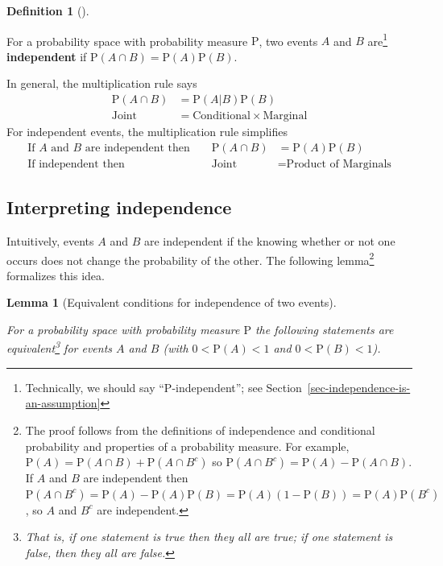 \documentclass[
  letterpaper,
  DIV=11,
  numbers=noendperiod]{scrreprt}
\theoremstyle{plain}
\newtheorem{lemma}{Lemma}[chapter]
\theoremstyle{definition}
\theoremstyle{definition}
\theoremstyle{definition}
\newtheorem{definition}{Definition}[chapter]
\theoremstyle{remark}
\begin{document}
\begin{definition}[]\protect\hypertarget{def-independent-events}{}\label{def-independent-events}

For a probability space with probability measure \(\textrm{P}\), two
events \(A\) and \(B\) are\footnote{Technically, we should say
  ``\(\textrm{P}\)-independent''; see
  Section~\ref{sec-independence-is-an-assumption}}
\textbf{independent} if
\(\textrm{P}(A \cap B) = \textrm{P}(A)\textrm{P}(B)\).

\end{definition}

In general, the multiplication rule says \begin{align*}
\textrm{P}(A \cap B) & = \textrm{P}(A|B)\textrm{P}(B)\\
\text{Joint} & = \text{Conditional}\times\text{Marginal}
\end{align*} For independent events, the multiplication rule simplifies
\begin{align*}
\text{If $A$ and $B$ are independent then } && \textrm{P}(A \cap B) & = \textrm{P}(A)\textrm{P}(B)\\
\text{If independent then } && \text{Joint} & = \text{Product of Marginals}
\end{align*}

\subsection{Interpreting independence}\label{interpreting-independence}

Intuitively, events \(A\) and \(B\) are independent if the knowing
whether or not one occurs does not change the probability of the other.
The following lemma\footnote{The proof follows from the definitions of
  independence and conditional probability and properties of a
  probability measure. For example,
  \(\textrm{P}(A) = \textrm{P}(A\cap B) + \textrm{P}(A \cap B^c)\) so
  \(\textrm{P}(A \cap B^c) = \textrm{P}(A) - \textrm{P}(A \cap B)\). If
  \(A\) and \(B\) are independent then
  \(\textrm{P}(A \cap B^c) = \textrm{P}(A) - \textrm{P}(A)\textrm{P}(B) = \textrm{P}(A)(1-\textrm{P}(B)) = \textrm{P}(A)\textrm{P}(B^c)\),
  so \(A\) and \(B^c\) are independent.} formalizes this idea.

\begin{lemma}[Equivalent conditions for independence of two
events]\protect\hypertarget{lem-independence-conditions}{}\label{lem-independence-conditions}

For a probability space with probability measure \(\textrm{P}\) the
following statements are equivalent\footnote{That is, if one statement
  is true then they all are true; if one statement is false, then they
  all are false.} for events \(A\) and \(B\) (with \(0<\textrm{P}(A)<1\)
and \(0<\textrm{P}(B)<1\)).

\end{lemma}
\end{document}
